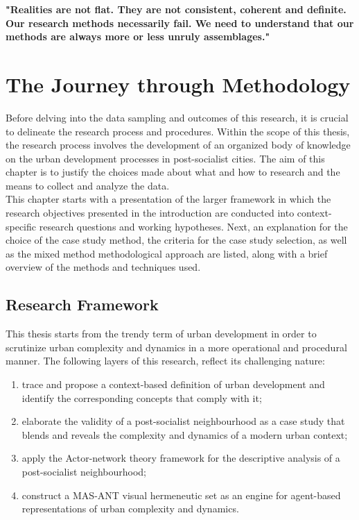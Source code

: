 \documentclass[11pt]{report}
\begin{document}
{{{{\textbf{"Realities are not flat. They are not consistent, coherent and definite. Our research methods necessarily fail. We need to understand that our methods are always more or less unruly assemblages." \href{Law}{\cite{law_making_2007}}}



\chapter{The Journey through Methodology}

Before delving into the data sampling and outcomes of this research, it is crucial to delineate the research process and procedures. Within the scope of this thesis, the research process involves the development of an organized body of knowledge on the urban development processes in post-socialist cities. The aim of this chapter is to justify the choices made about what and how to research and the means to collect and analyze the data.
\\

This chapter starts with a presentation of the larger framework in which the research objectives presented in the introduction are conducted into context-specific research questions and working hypotheses. Next, an explanation for the choice of the case study method, the criteria for the case study selection, as well as the mixed method methodological approach are listed, along with a brief overview of the methods and techniques used.


\section{Research Framework}

This thesis starts from the trendy term of urban development in order to scrutinize urban complexity and dynamics in a more operational and procedural manner. The following layers of this research, reflect its challenging nature:

\begin{enumerate}
\item trace and propose a context-based definition of urban development and identify the corresponding concepts that comply with it;
\item elaborate the validity of a post-socialist neighbourhood as a case study that blends and reveals the complexity and dynamics of a modern urban context;
\item apply the Actor-network theory framework for the descriptive analysis of a post-socialist neighbourhood;
\item construct a MAS-ANT visual hermeneutic set as an engine for agent-based representations of urban complexity and dynamics.    
\end{enumerate}

}}}}
\end{document}
